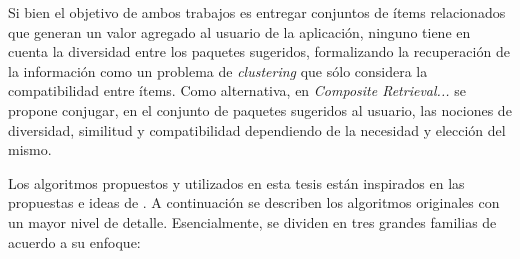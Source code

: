 Si bien el objetivo de ambos trabajos es entregar conjuntos de ítems relacionados que generan un valor agregado al usuario de la aplicación, ninguno tiene en cuenta la diversidad entre los paquetes sugeridos, formalizando la recuperación de la información como un problema de {\em clustering} que sólo considera la compatibilidad entre ítems. Como alternativa, en \textit{Composite Retrieval...} \cite{journals/tkde/Amer-YahiaBCFMZ14} se propone conjugar, en el conjunto de paquetes sugeridos al usuario, las nociones de diversidad, similitud y compatibilidad dependiendo de la necesidad y elección del mismo.

Los algoritmos propuestos y utilizados en esta tesis están inspirados en las propuestas e ideas de \cite{journals/tkde/Amer-YahiaBCFMZ14}. A continuación se describen los algoritmos originales con un mayor nivel de detalle. Esencialmente, se dividen en tres grandes familias de acuerdo a su enfoque:

